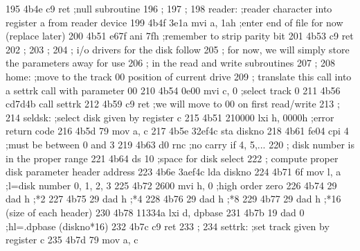 195      4b4e c9                   ret                   ;null subroutine
196                       ;
197                       ;
198                       reader:  ;reader character into register a from reader device
199      4b4f 3e1a                 mvi    a, 1ah         ;enter end of file for now (replace later)
200      4b51 e67f                 ani    7fh            ;remember to strip parity bit
201      4b53 c9                   ret     
202                       ;
203                       ;
204                       ;        i/o drivers for the disk follow
205                       ;        for now, we will simply store the parameters away for use
206                       ;        in the read and write subroutines
207                       ;
208                       home:    ;move to the track 00 position of current drive
209                       ;        translate this call into a settrk call with parameter 00
210      4b54 0e00                 mvi    c, 0           ;select track 0
211      4b56 cd7d4b               call   settrk
212      4b59 c9                   ret                   ;we will move to 00 on first read/write
213                       ;
214                       seldsk:  ;select disk given by register c
215      4b51 210000               lxi    h, 0000h       ;error return code
216      4b5d 79                   mov    a, c
217      4b5e 32ef4c               sta    diskno
218      4b61 fe04                 cpi    4              ;must be between 0 and 3
219      4b63 d0                   rnc                   ;no carry if 4, 5,...
220                       ;        disk number is in the proper range
221      4b64                      ds     10             ;space for disk select
222                       ;        compute proper disk parameter header address
223      4b6e 3aef4c               lda    diskno
224      4b71 6f                   mov    l, a           ;l=disk number 0, 1, 2, 3
225      4b72 2600                 mvi    h, 0           ;high order zero
226      4b74 29                   dad    h              ;*2
227      4b75 29                   dad    h              ;*4
228      4b76 29                   dad    h              ;*8
229      4b77 29                   dad    h              ;*16 (size of each header)
230      4b78 11334a               lxi    d, dpbase
231      4b7b 19                   dad    0              ;hl=.dpbase (diskno*16)
232      4b7c c9                   ret
233                       ;
234                       settrk:  ;set track given by register c
235      4b7d 79                   mov    a, c
